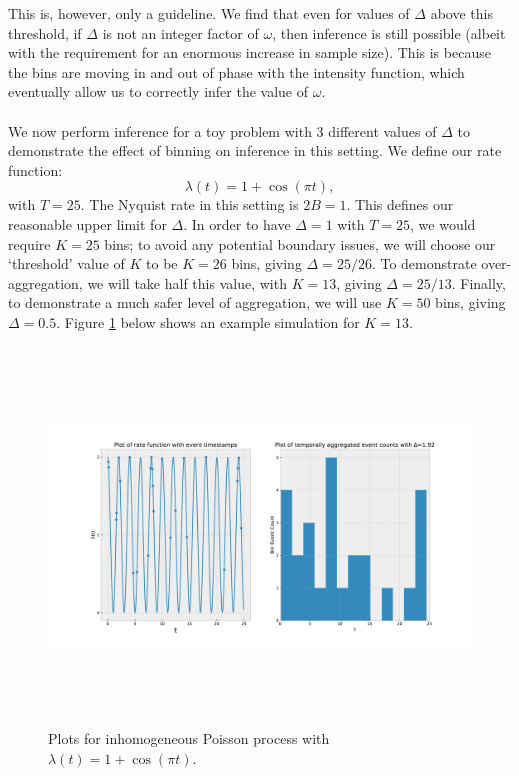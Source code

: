 \documentclass[11pt,a4,twosided,singlespacing,titlepagenumber=on,numbers=endperiod]{scrreprt}
\numberwithin{equation}{chapter} %
\theoremstyle{remark}
\begin{document}
This is, however, only a guideline. We find that even for values of $\Delta$ above this threshold, if $\Delta$ is not an integer factor of $\omega$, then inference is still possible (albeit with the requirement for an enormous increase in sample size). This is because the bins are moving in and out of phase with the intensity function, which eventually allow us to correctly infer the value of $\omega$. \\\\
We now perform inference for a toy problem with 3 different values of $\Delta$ to demonstrate the effect of binning on inference in this setting. We define our rate function:
\begin{equation*}
	\lambda(t) = 1 + \cos(\pi t),
\end{equation*}
with $T=25$. The Nyquist rate in this setting is $2B=1$. This defines our reasonable upper limit for $\Delta$. In order to have $\Delta=1$ with $T=25$, we would require $K=25$ bins; to avoid any potential boundary issues, we will choose our `threshold' value of $K$ to be $K=26$ bins, giving $\Delta=25/26$. To demonstrate over-aggregation, we will take half this value, with $K=13$, giving $\Delta=25/13$. Finally, to demonstrate a much safer level of aggregation, we will use $K = 50$ bins, giving $\Delta=0.5$. Figure \ref{fig:nhpp_periodic_unid} below shows an example simulation for $K=13$.
\begin{figure}[!h]
	\includegraphics[height=10cm, width=16cm]{nhpp_periodic_unid.pdf}
	\centering
	\caption{Plots for inhomogeneous Poisson process with $\lambda(t)= 1 + \cos(\pi t)$.}
	\label{fig:nhpp_periodic_unid}
\end{figure}
\end{document}
